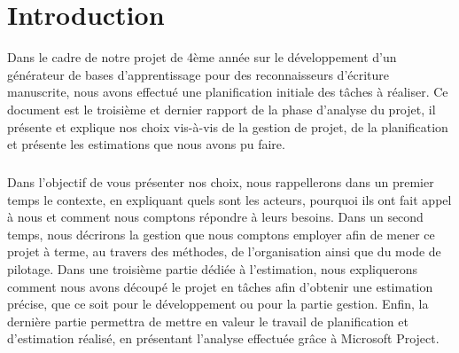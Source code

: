 \chapter{Introduction}
\setcounter{page}{1}
\pagestyle{fancy}
\fancyhf{}
\cfoot[\thepage]{\thepage}

Dans le cadre de notre projet de 4ème année sur le développement d’un générateur de bases d’apprentissage pour des reconnaisseurs d’écriture manuscrite, nous avons effectué une planification initiale des tâches à réaliser. Ce document est le troisième et dernier rapport de la phase d’analyse du projet, il présente et explique nos choix vis-à-vis de la gestion de projet, de la planification et présente les estimations que nous avons pu faire.

\paragraph{}
Dans l’objectif de vous présenter nos choix, nous rappellerons dans un premier temps le contexte, en expliquant quels sont les acteurs, pourquoi ils ont fait appel à nous et comment nous comptons répondre à leurs besoins. Dans un second temps, nous décrirons la gestion que nous comptons employer afin de mener ce projet à terme, au travers des méthodes, de l’organisation ainsi que du mode de pilotage. Dans une troisième partie dédiée à l’estimation, nous expliquerons comment nous avons découpé le projet en tâches afin d’obtenir une estimation précise, que ce soit pour le développement ou pour la partie gestion. Enfin, la dernière partie permettra de mettre en valeur le travail de planification et d’estimation réalisé, en présentant l’analyse effectuée grâce à Microsoft Project.
